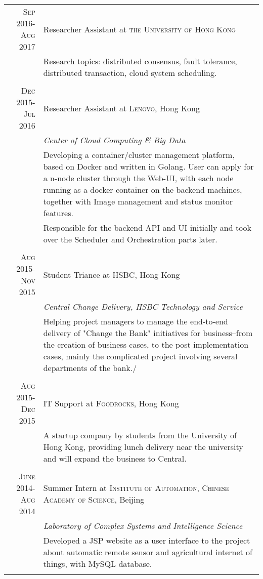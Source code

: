 \documentclass[a4paper,8pt]{article} %
\begin{document}
\begin{tabular}{r|p{11cm}}

\textsc{Sep 2016-Aug 2017} & Researcher Assistant at \textsc{the University of Hong Kong}\\
& \footnotesize{Research topics: distributed consensus, fault tolerance, distributed transaction, cloud system scheduling.}\\
\multicolumn{2}{c}{} \\




\textsc{Dec 2015-Jul 2016} & Researcher Assistant at \textsc{Lenovo}, Hong Kong\\
& \emph{Center of Cloud Computing \& Big Data} \\
& \footnotesize{Developing a container/cluster management platform, based on Docker and written in Golang. User can apply for a n-node cluster through the Web-UI, with each node running as a docker container on the backend machines, together with Image management and status monitor features.} \\
& \footnotesize{Responsible for the backend API and UI initially and took over the Scheduler and Orchestration parts later.}\\
\multicolumn{2}{c}{} \\

\textsc{Aug 2015-Nov 2015}  & Student Trianee at \textsc{HSBC}, Hong Kong \\
& \emph{Central Change Delivery, HSBC Technology and Service}\\ 
& \footnotesize{Helping project managers to manage the end-to-end delivery of "Change the Bank" initiatives for business--from the creation of business cases, to the post implementation cases, mainly the complicated project involving several departments of the bank./}\\
\multicolumn{2}{c}{} \\

\textsc{Aug 2015-Dec 2015} & IT Support at \textsc{Foodrocks}, Hong Kong \\
& \footnotesize{A startup company by students from the University of Hong Kong, providing lunch delivery near the university and will expand the business to Central. }\\
\multicolumn{2}{c}{} \\

\textsc{June 2014-Aug 2014} & Summer Intern at \textsc{Institute of Automation, Chinese Academy of Science}, Beijing\\
& \emph{Laboratory of Complex Systems and Intelligence Science} \\
& \footnotesize{Developed a JSP website as a user interface to the project about automatic remote sensor and agricultural internet of things, with MySQL database.}\\
\multicolumn{2}{c}{} \\
\end{tabular}
\end{document}
